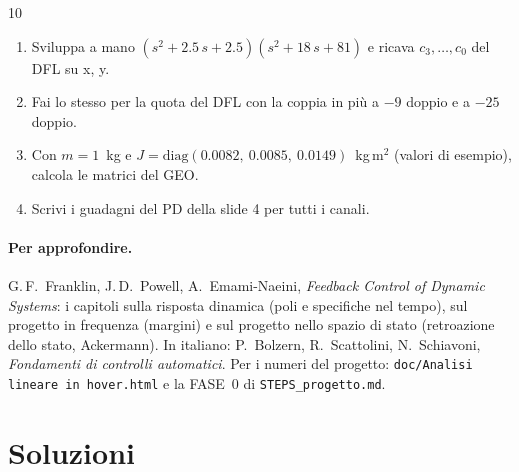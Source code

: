 \documentclass[11pt,a4paper]{article}
\begin{document}
\begin{esercizio}{10}
\begin{enumerate}[label=(\alph*)]
  \item Sviluppa a mano $(s^2 + 2.5\,s + 2.5)(s^2 + 18\,s + 81)$ e ricava $c_3, \dots, c_0$ del DFL su x, y.
  \item Fai lo stesso per la quota del DFL con la coppia in più a $-9$ doppio e a $-25$ doppio.
  \item Con $m = 1$~kg e $J = \mathrm{diag}(0.0082,\ 0.0085,\ 0.0149)$~kg\,m$^2$ (valori di esempio), calcola le matrici del GEO.
  \item Scrivi i guadagni del PD della slide 4 per tutti i canali.
\end{enumerate}
\end{esercizio}

\paragraph{Per approfondire.} G.\,F.~Franklin, J.\,D.~Powell, A.~Emami-Naeini, \emph{Feedback Control of Dynamic Systems}: i capitoli sulla risposta dinamica (poli e specifiche nel tempo), sul progetto in frequenza (margini) e sul progetto nello spazio di stato (retroazione dello stato, Ackermann). In italiano: P.~Bolzern, R.~Scattolini, N.~Schiavoni, \emph{Fondamenti di controlli automatici}. Per i numeri del progetto: \texttt{doc/Analisi lineare in hover.html} e la FASE~0 di \texttt{STEPS\_progetto.md}.

\appendix
\section{Soluzioni}\label{app:soluzioni}
\end{document}
